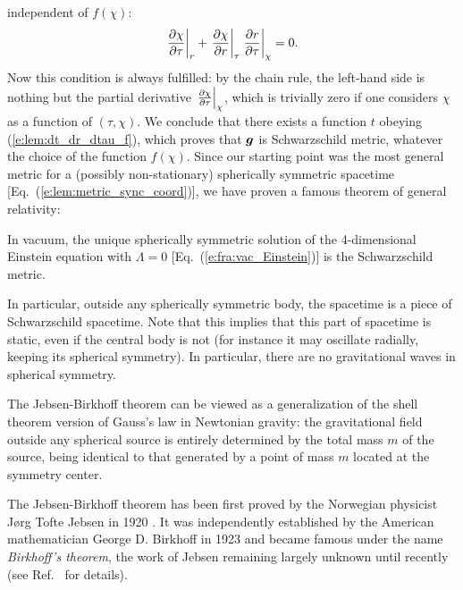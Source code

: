 independent of $f(\chi)$:
\[
    \left. \frac{\partial \chi}{\partial \tau} \right| _r  +
    \left. \frac{\partial \chi}{\partial r} \right| _\tau \left. \frac{\partial r}{\partial \tau} \right| _\chi = 0 .
\]
Now this condition is always fulfilled:
by the chain rule, the left-hand side is nothing but the partial derivative
$\left. \frac{\partial \chi}{\partial \tau} \right| _\chi$, which is trivially zero
if one considers $\chi$ as a function of $(\tau,\chi)$.
We conclude that there exists a function $t$ obeying
(\ref{e:lem:dt_dr_dtau_f}), which proves that $\bm{g}$ is
Schwarzschild metric, whatever the choice of the function $f(\chi)$.
Since our starting point was
the most general metric for a (possibly non-stationary) spherically symmetric spacetime
[Eq.~(\ref{e:lem:metric_sync_coord})], we have proven
a famous theorem of general relativity:

\begin{prop}
\label{p:lem:Birkhoff}
In vacuum, the unique spherically symmetric solution of the 4-dimensional
Einstein equation with $\Lambda=0$ [Eq.~(\ref{e:fra:vac_Einstein})]
is the Schwarzschild metric.
\end{prop}

In particular, outside any spherically symmetric body, the spacetime
is a piece of Schwarz\-schild spacetime. Note that this implies that this part of
spacetime is static, even if the central body is not (for instance it may oscillate
radially, keeping its spherical symmetry). In particular, there are no
gravitational waves in spherical symmetry.
\begin{remark}
The Jebsen-Birkhoff theorem can be viewed as a generalization of the shell theorem version
of Gauss's law in Newtonian gravity:
the gravitational field outside any spherical source is entirely determined by the total
mass $m$ of the source, being identical to that generated by a point of mass $m$
located at the symmetry center.
\end{remark}

\begin{hist}
The Jebsen-Birkhoff theorem has been first proved by the Norwegian physicist
Jørg Tofte Jebsen in 1920 \cite{Jebse1921}. It was independently established by the American mathematician George D. Birkhoff in 1923 \cite{Birkh1923} and became famous under the
name \emph{Birkhoff's theorem}, the work of Jebsen remaining largely unknown until recently (see Ref.~\cite{JohanR06} for details).
\end{hist}

